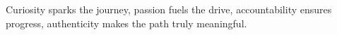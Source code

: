 \documentclass[preview]{standalone}
\begin{document}
\begin{center}
Curiosity sparks the journey, passion fuels the drive, accountability ensures progress, authenticity makes the path truly meaningful.
\end{center}
\end{document}

